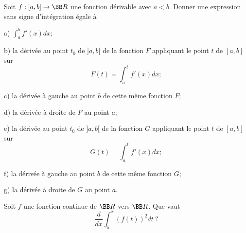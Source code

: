 \documentclass[12pt,french,oneside,a4paper]{memoir} %
\begin{document}
\begin{exo}
Soit $f:[a,b]\rightarrow{\BB R}$ une fonction dérivable avec
$a<b$. Donner une expression sans signe d'intégration égale à

a) $\displaystyle{\int^b_af'(x)dx}$;

b) la dérivée au point $t_0$ de $]a,b[$ de la fonction $F$
appliquant le point $t$ de $[a,b]$ sur
\begin{equation*}
F(t)=\int^t_af'(x)dx;
\end{equation*}

c) la dérivée à gauche au point $b$ de cette même fonction
$F$;

d) la dérivée à droite de $F$ au point $a$;

e) la dérivée au point $t_0$ de $]a,b[$ de la fonction $G$
appliquant le point $t$ de $[a,b]$ sur
\begin{equation*}
G(t)=\int^t_af'(x)dx;
\end{equation*}

f) la dérivée à gauche au point $b$ de cette même fonction
$G$;

g) la dérivée à droite de $G$ au point $a$.
\end{exo}
\begin{exo}
Soit $f$ une fonction continue de ${\BB R}$ vers ${\BB R}$. Que
vaut
\begin{equation*}
\frac{d}{dx}\int^x_5(f(t))^2dt~? 
\end{equation*}
\end{exo}
\end{document}

